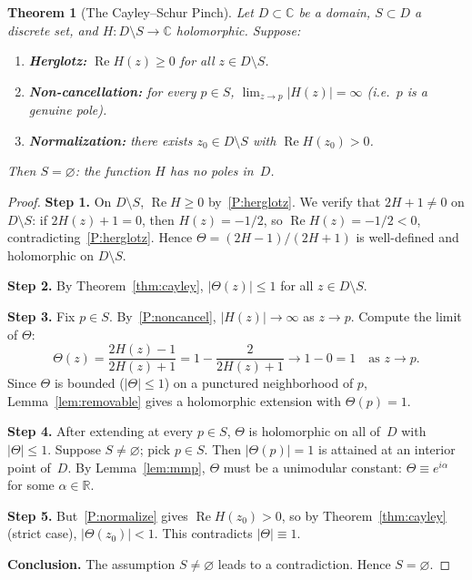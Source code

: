 \documentclass[11pt]{amsart}
\newtheorem{theorem}{Theorem}[section]
\theoremstyle{definition}
\theoremstyle{remark}
\newcommand{\C}{\mathbb{C}}
\newcommand{\R}{\mathbb{R}}
\DeclareMathOperator{\re}{Re}
\begin{document}
\begin{theorem}[The Cayley--Schur Pinch]\label{thm:pinch}
Let $D\subset\C$ be a domain, $S\subset D$ a discrete set, and
$H:D\setminus S\to\C$ holomorphic.  Suppose:
\begin{enumerate}[label=\textup{(P\arabic*)},nosep]
\item\label{P:herglotz}
  \textbf{Herglotz:} $\re H(z)\ge 0$ for all $z\in D\setminus S$.
\item\label{P:noncancel}
  \textbf{Non-cancellation:} for every $p\in S$,
  $\lim_{z\to p}|H(z)|=\infty$ (i.e.\ $p$ is a genuine pole).
\item\label{P:normalize}
  \textbf{Normalization:} there exists $z_0\in D\setminus S$ with
  $\re H(z_0)>0$.
\end{enumerate}
Then $S=\varnothing$: the function $H$ has no poles in~$D$.
\end{theorem}
\begin{proof}
\textbf{Step 1.}  On $D\setminus S$, $\re H\ge0$ by~\ref{P:herglotz}.
We verify that $2H+1\neq0$ on $D\setminus S$:
if $2H(z)+1=0$, then $H(z)=-1/2$, so $\re H(z)=-1/2<0$,
contradicting~\ref{P:herglotz}.
Hence $\Theta=(2H-1)/(2H+1)$ is well-defined and holomorphic on
$D\setminus S$.

\textbf{Step 2.}  By Theorem~\ref{thm:cayley}, $|\Theta(z)|\le 1$
for all $z\in D\setminus S$.

\textbf{Step 3.}  Fix $p\in S$.  By~\ref{P:noncancel},
$|H(z)|\to\infty$ as $z\to p$.  Compute the limit of $\Theta$:
\[
\Theta(z)=\frac{2H(z)-1}{2H(z)+1}=1-\frac{2}{2H(z)+1}\to 1-0=1
\quad\text{as }z\to p.
\]
Since $\Theta$ is bounded ($|\Theta|\le1$) on a punctured neighborhood
of $p$, Lemma~\ref{lem:removable} gives a holomorphic extension with
$\Theta(p)=1$.

\textbf{Step 4.}  After extending at every $p\in S$, $\Theta$ is
holomorphic on all of~$D$ with $|\Theta|\le1$.
Suppose $S\neq\varnothing$; pick $p\in S$.  Then $|\Theta(p)|=1$ is
attained at an interior point of~$D$.
By Lemma~\ref{lem:mmp}, $\Theta$ must be a unimodular constant:
$\Theta\equiv e^{i\alpha}$ for some $\alpha\in\R$.

\textbf{Step 5.}  But~\ref{P:normalize} gives $\re H(z_0)>0$, so
by Theorem~\ref{thm:cayley} (strict case),
$|\Theta(z_0)|<1$.  This contradicts $|\Theta|\equiv 1$.

\textbf{Conclusion.}  The assumption $S\neq\varnothing$ leads to a
contradiction.  Hence $S=\varnothing$.
\end{proof}
\end{document}
